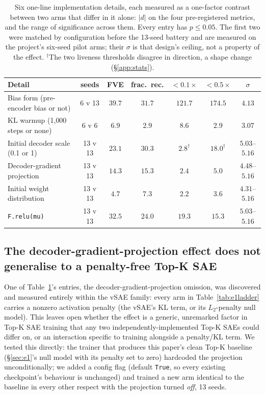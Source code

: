 \documentclass[11pt]{article}
\begin{document}
\begin{table}[h]
\centering
\caption{Six one-line implementation details, each measured as a one-factor
contrast between two arms that differ in it alone: $|d|$ on the four
pre-registered metrics, and the range of significance across them. Every
entry has $p\le0.05$. The first two were matched by configuration before the
13-seed battery and are measured on the project's six-seed pilot arms; their
$\sigma$ is that design's ceiling, not a property of the effect.
$^\dagger$The two liveness thresholds disagree in direction, a shape change
(\S\ref{app:stats}).}
\label{tab:variance}
\small\setlength{\tabcolsep}{4pt}
\begin{tabular}{lcccccc}
\toprule
Detail & seeds & FVE & frac.\ rec. & $<0.1\times$ & $<0.5\times$ & $\sigma$ \\
\midrule
Bias form (pre-encoder bias or not) & 6 v 13 & $39.7$ & $31.7$ & $121.7$ & $174.5$ & $4.13$ \\
KL warmup (1{,}000 steps or none) & 6 v 6 & $6.9$ & $2.9$ & $8.6$ & $2.9$ & $3.07$ \\
Initial decoder scale (0.1 or 1) & 13 v 13 & $23.1$ & $30.3$ & $2.8^\dagger$ & $18.0^\dagger$ & $5.03$--$5.16$ \\
Decoder-gradient projection & 13 v 13 & $14.3$ & $15.3$ & $2.4$ & $5.0$ & $4.48$--$5.16$ \\
Initial weight distribution & 13 v 13 & $4.7$ & $7.3$ & $2.2$ & $3.6$ & $4.31$--$5.16$ \\
\texttt{F.relu(mu)} & 13 v 13 & $32.5$ & $24.0$ & $19.3$ & $15.3$ & $5.03$--$5.16$ \\
\bottomrule
\end{tabular}
\end{table}

\subsection{The decoder-gradient-projection effect does not generalise to a penalty-free Top-K SAE}
\label{sec:claim4}

One of Table~\ref{tab:variance}'s entries, the
decoder-gradient-projection omission, was discovered and measured entirely
within the vSAE family: every arm in Table~\ref{tab:e1ladder} carries a
nonzero activation penalty (the vSAE's KL term, or its $L_2$-penalty null
model). This leaves open whether the effect is a generic, unremarked factor
in Top-K SAE training that any two independently-implemented Top-K SAEs
could differ on, or an interaction specific to training alongside a
penalty/KL term. We tested this directly: the trainer that produces this
paper's clean Top-K baseline (\S\ref{sec:e1}'s null model with its penalty
set to zero) hardcoded the projection unconditionally; we added a config
flag (default \texttt{True}, so every existing checkpoint's behaviour is
unchanged) and trained a new arm identical to the baseline in every other
respect with the projection turned \emph{off}, 13 seeds.
\end{document}
